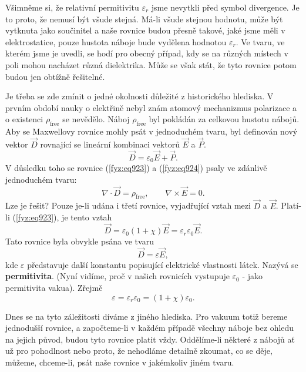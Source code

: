     Všimněme si, že relativní permitivitu \(\varepsilon_r\) jsme nevytkli před symbol divergence. Je
    to proto, že nemusí být všude stejná. Má-li všude stejnou hodnotu, může být vytknuta jako
    součinitel a naše rovnice budou přesně takové, jaké jsme měli v elektrostatice, pouze hustota
    náboje bude vydělena hodnotou \(\varepsilon_r\). Ve tvaru, ve kterém jsme je uvedli, se hodí pro
    obecný případ, kdy se na různých místech v poli mohou nacházet různá dielektrika. Může se však
    stát, že tyto rovnice potom budou jen obtížně řešitelné.

    Je třeba se zde zmínit o jedné okolnosti důležité z historického hlediska. V prvním období nauky
    o elektřině nebyl znám atomový mechanizmus polarizace a o existenci \(ρ_{\text{free}}\) se
    nevědělo. Náboj \(ρ_{\text{free}}\) byl pokládán za celkovou hustotu nábojů. Aby se Maxwellovy
    rovnice mohly psát v jednoduchém tvaru, byl definován nový vektor \(\vec{D}\) rovnající se
    lineární kombinaci vektorů \(\vec{E}\) a \(\vec{P}\).
    \begin{equation}\label{fyz:eq926}
      \vec{D}=\varepsilon_0\vec{E}+\vec{P}.
    \end{equation}
    V důsledku toho se rovnice (\ref{fyz:eq923}) a (\ref{fyz:eq924}) psaly ve zdánlivě jednoduchém
    tvaru:
    \begin{equation}\label{fyz:eq927}
      ∇\cdot\vec{D}=ρ_{\text{free}},\qquad ∇×\vec{E}=0.
    \end{equation}
    Lze je řešit? Pouze je-li udána i třetí rovnice, vyjadřující vztah mezi \(\vec{D}\) a
    \(\vec{E}\). Platí-li (\ref{fyz:eq923}), je tento vztah
    \begin{equation}\label{fyz:eq928}
      \vec{D}=\varepsilon_0(1+χ)\vec{E}=\varepsilon_r\varepsilon_0\vec{E}.
    \end{equation}
    Tato rovnice byla obvykle psána ve tvaru
    \begin{equation}\label{fyz:eq929}
      \vec{D}=\varepsilon\vec{E},
    \end{equation}
    kde \(\varepsilon\) představuje další konstantu popisující elektrické vlastnosti látek. Nazývá
    se \textbf{permitivita}. (Nyní vidíme, proč v našich rovnicích vystupuje \(\varepsilon_0\) -
    jako permitivita vakua). Zřejmě
    \begin{equation}\label{fyz:eq930}
      \varepsilon=\varepsilon_r\varepsilon_0=(1+χ)\varepsilon_0.
    \end{equation}
    
    Dnes se na tyto záležitosti díváme z jiného hlediska. Pro vakuum totiž bereme jednodušší
    rovnice, a započteme-li v každém případě všechny náboje bez ohledu na jejich původ, budou tyto
    rovnice platit vždy. Oddělíme-li některé z nábojů ať už pro pohodlnost nebo proto, že nehodláme
    detailně zkoumat, co se děje, můžeme, chceme-li, psát naše rovnice v jakémkoliv jiném tvaru.

